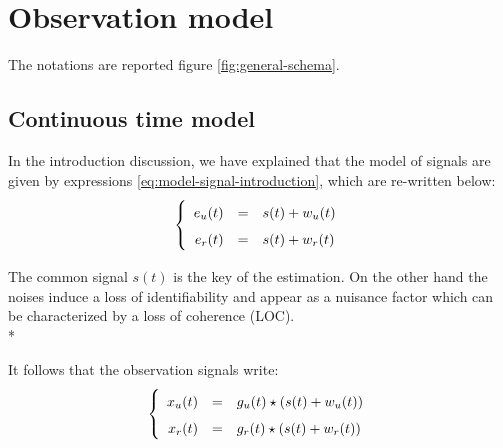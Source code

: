 \section{Observation model}
The notations are reported figure \ref{fig:general-schema}.  
\subsection{Continuous time model}

In the introduction discussion, we have explained that the model of signals are given by expressions \eqref{eq:model-signal-introduction}, which are re-written below:
\begin{eqnarray}
\label{eq:model-of-excitation}
\left\{
\renewcommand\arraystretch{1.6}
\begin{array}{rcl}
e_{\ut}(t)&=&s(t)+w_{\ut}(t)
\\
e_{\rf}(t)&=&s(t)+w_{\rf}(t)
\end{array}
\right.
\end{eqnarray}


The common signal $s(t)$ is the key of the estimation. On the other hand the noises induce a loss of identifiability and appear as a nuisance factor which can be characterized by a loss of coherence (LOC). \\*


It follows that the observation signals write:
\begin{eqnarray}
\label{eq:model-of-obervation}
\left\{
\renewcommand\arraystretch{1.6}
\begin{array}{rcl}
x_{\ut}(t)&=&g_{\ut} (t)\star(s(t)+w_{\ut}(t))
\\
x_{\rf}(t)&=&g_{\rf}(t) \star (s(t)+w_{\rf}(t))
\end{array}
\right.
\end{eqnarray}

